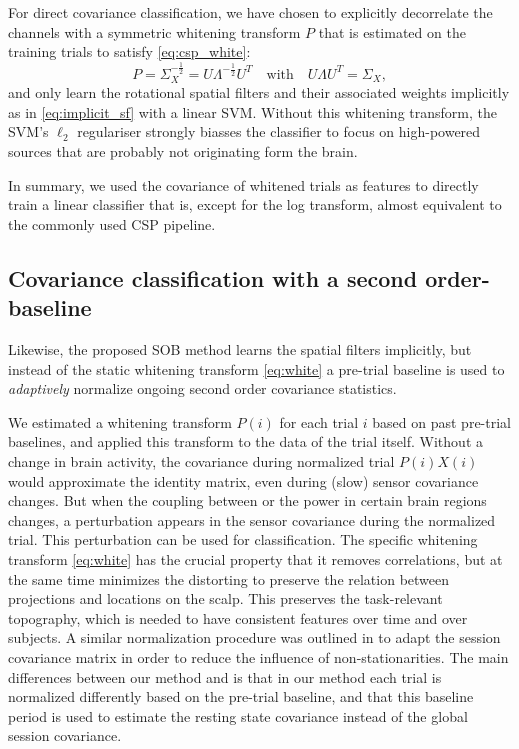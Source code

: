 For direct covariance classification, we have chosen to explicitly decorrelate
the channels with a symmetric whitening transform $P$ that is estimated on the
training trials to satisfy \eqref{eq:csp_white}:
\begin{equation}
  P = \Sigma_X^{-\frac{1}{2}} = U \Lambda^{-\frac{1}{2}} U^T 
    \quad \text{with} \quad U \Lambda U^T = \Sigma_X,
    \label{eq:white}
\end{equation}
and only learn the rotational spatial filters and their associated weights
implicitly as in \eqref{eq:implicit_sf}  with a linear \ac{SVM}. Without this
whitening transform, the \ac{SVM}'s $\ell_2$ regulariser strongly biasses the
classifier to focus on high-powered sources that are probably not
originating form the brain.

In summary, we used the covariance of whitened trials as features to directly
train a linear classifier that is, except for the log transform, almost
equivalent to the commonly used \ac{CSP} pipeline.

\subsection{Covariance classification with a second order-baseline}
Likewise, the proposed \acf{SOB} method learns the spatial filters implicitly,
but instead of the static whitening transform \eqref{eq:white} a pre-trial
baseline is used to \emph{adaptively} normalize ongoing second order covariance
statistics.

We estimated a whitening transform $P(i)$ for each trial $i$ based on past
pre-trial baselines, and applied this transform to the data of the trial itself.
Without a change in brain activity, the covariance during normalized trial
$P(i)X(i)$ would approximate the identity matrix, even during (slow) sensor
covariance changes. But when the coupling between or the power in certain
brain regions changes, a perturbation appears in the sensor covariance during
the normalized trial. This perturbation can be used for classification.
%
The specific whitening transform \eqref{eq:white} has the crucial property that
it removes correlations, but at the same time minimizes the distorting to
preserve the relation between projections and locations on the scalp. This
preserves the task-relevant topography, which is needed to have consistent
features over time and over subjects.
%
A similar normalization procedure was outlined in \cite{tomioka2006asf} to
adapt the session covariance matrix in order to reduce the influence of
non-stationarities. The main differences between our method and
\cite{tomioka2006asf} is that in our method each trial is normalized
differently based on the pre-trial baseline, and that this baseline period is
used to estimate the resting state covariance instead of the global session
covariance.

